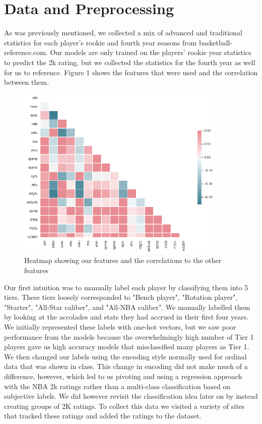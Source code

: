 \documentclass{article}
\begin{document}
\section{Data and Preprocessing}
As was previously mentioned, we collected a mix of advanced and traditional statistics for each player's rookie and fourth year seasons from basketball-reference.com. Our models are only trained on the players' rookie year statistics to predict the 2k rating, but we collected the statistics for the fourth year as well for us to reference. Figure 1 shows the features that were used and the correlation between them. 
\begin{figure}[htp]
    \centering
    \includegraphics[width=10cm]{feature_heatmap.png}
    \caption{Heatmap showing our features and the correlations to the other features}
\end{figure} 

Our first intuition was to manually label each player by classifying them into 5 tiers. These tiers loosely corresponded to "Bench player", "Rotation player", "Starter", "All-Star caliber", and "All-NBA caliber". We manually labelled them by looking at the accolades and stats they had accrued in their first four years. We initially represented these labels with one-hot vectors, but we saw poor performance from the models because the overwhelmingly high number of Tier 1 players gave us high accuracy models that misclassified many players as Tier 1. We then changed our labels using the encoding style normally used for ordinal data that was shown in class. This change in encoding did not make much of a difference, however, which led to us pivoting and using a regression approach with the NBA 2k ratings rather than a multi-class classification based on subjective labels. We did however revisit the classification idea later on by instead creating groups of 2K ratings. To collect this data we visited a variety of sites that tracked these ratings and added the ratings to the dataset.
\end{document}

